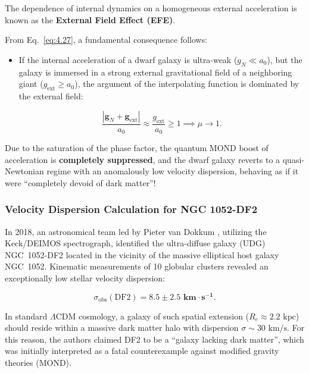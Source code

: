 \documentclass[11pt,a4paper]{article}
\theoremstyle{definition}
\begin{document}
The dependence of internal dynamics on a homogeneous external acceleration is known as the \textbf{External Field Effect (EFE)}.

From Eq.~\eqref{eq:4.27}, a fundamental consequence follows:

\begin{itemize}
\item If the internal acceleration of a dwarf galaxy is ultra-weak ($g_N \ll a_0$), but the galaxy is immersed in a strong external gravitational field of a neighboring giant ($g_{\text{ext}} \ge a_0$), the argument of the interpolating function is dominated by the external field:

\begin{equation}\label{eq:4.28}\tag{4.28}
\frac{|\mathbf{g}_N + \mathbf{g}_{\text{ext}}|}{a_0} \approx \frac{g_{\text{ext}}}{a_0} \ge 1 \implies \mu \to 1.
\end{equation}
\end{itemize}

Due to the saturation of the phase factor, the quantum MOND boost of acceleration is \textbf{completely suppressed}, and the dwarf galaxy reverts to a quasi-Newtonian regime with an anomalously low velocity dispersion, behaving as if it were ``completely devoid of dark matter''!


\subsubsection{Velocity Dispersion Calculation for NGC 1052-DF2}\label{sec:4.3.2}

In 2018, an astronomical team led by Pieter van Dokkum \cite{ref28}, utilizing the Keck/DEIMOS spectrograph, identified the ultra-diffuse galaxy (UDG) NGC~1052-DF2 located in the vicinity of the massive elliptical host galaxy NGC~1052. Kinematic measurements of 10 globular clusters revealed an exceptionally low stellar velocity dispersion:

\begin{equation}\label{eq:4.29}\tag{4.29}
\sigma_{\text{obs}}(\text{DF2}) = \mathbf{8.5 \pm 2.5\text{ km}\cdot\text{s}^{-1}}.
\end{equation}

In standard $\Lambda\text{CDM}$ cosmology, a galaxy of such spatial extension ($R_e \approx 2.2\text{ kpc}$) should reside within a massive dark matter halo with dispersion $\sigma \sim 30\text{ km/s}$. For this reason, the authors claimed DF2 to be a ``galaxy lacking dark matter'', which was initially interpreted as a fatal counterexample against modified gravity theories (MOND).
\end{document}
